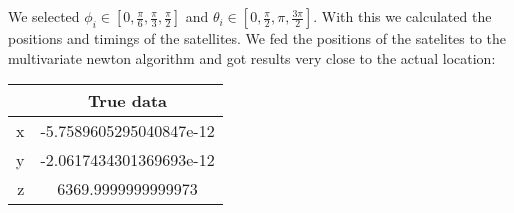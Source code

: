 \documentclass[a4paper]{article}
\begin{document}
\section{}
\section{}

We selected $\phi_i \in [0, \frac{\pi}{6}, \frac{\pi}{3}, \frac{\pi}{2}]$ and $\theta_i \in [0, \frac{\pi}{2}, \pi, \frac{3\pi}{2}]$. With this we calculated the positions and timings of the satellites. We fed the positions of the satelites to the multivariate newton algorithm and got results very close to the actual location:
\begin{center}
	\begin{tabular}{r | c}
		& True data\\ \hline
		x & -5.7589605295040847e-12\\ \hline
		y & -2.0617434301369693e-12\\ \hline
		z & 6369.9999999999973\\ \hline
	\end{tabular}
\end{center}
\end{document}
